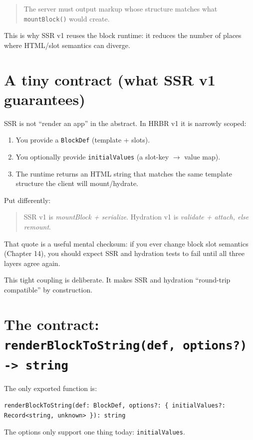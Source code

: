 \begin{quote}
The server must output markup whose structure matches what \texttt{mountBlock()} would create.
\end{quote}

This is why SSR v1 reuses the block runtime: it reduces the number of places where HTML/slot semantics can diverge.

\section{A tiny contract (what SSR v1 guarantees)}

SSR is not “render an app” in the abstract. In HRBR v1 it is narrowly scoped:

\begin{enumerate}
  \item You provide a \texttt{BlockDef} (template + slots).
  \item You optionally provide \texttt{initialValues} (a slot-key \(\rightarrow\) value map).
  \item The runtime returns an HTML string that matches the same template structure the client will mount/hydrate.
\end{enumerate}

Put differently:

\begin{quote}
SSR v1 is \emph{mountBlock + serialize}. Hydration v1 is \emph{validate + attach, else remount}.
\end{quote}

That quote is a useful mental checksum: if you ever change block slot semantics (Chapter 14), you should expect SSR and hydration tests to fail until all three layers agree again.

This tight coupling is deliberate. It makes SSR and hydration “round-trip compatible” by construction.

\section{The contract: \texttt{renderBlockToString(def, options?) -> string}}

The only exported function is:

\begin{verbatim}
renderBlockToString(def: BlockDef, options?: { initialValues?: Record<string, unknown> }): string
\end{verbatim}

The options only support one thing today: \texttt{initialValues}.

